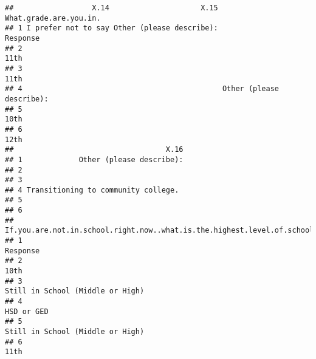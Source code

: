 \documentclass[
]{article}
\begin{document}
\begin{verbatim}
##                  X.14                     X.15   What.grade.are.you.in.
## 1 I prefer not to say Other (please describe):                 Response
## 2                                                                  11th
## 3                                                                  11th
## 4                                              Other (please describe):
## 5                                                                  10th
## 6                                                                  12th
##                                   X.16
## 1             Other (please describe):
## 2                                     
## 3                                     
## 4 Transitioning to community college. 
## 5                                     
## 6                                     
##   If.you.are.not.in.school.right.now..what.is.the.highest.level.of.school.you.have.completed.so.far..
## 1                                                                                            Response
## 2                                                                                                10th
## 3                                                                    Still in School (Middle or High)
## 4                                                                                          HSD or GED
## 5                                                                    Still in School (Middle or High)
## 6                                                                                                11th
\end{verbatim}
\end{document}
